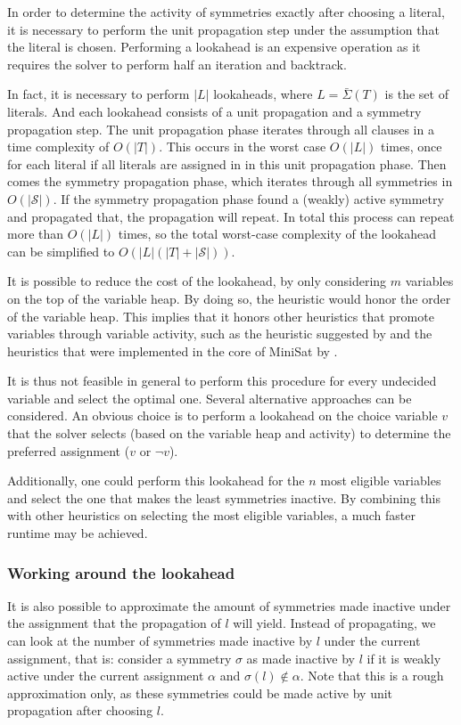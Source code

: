 	In order to determine the activity of symmetries exactly after choosing a literal,
	it is necessary to perform the unit propagation step under the assumption that the literal is chosen.
	Performing a lookahead is an expensive operation as it requires the solver to perform half an
	iteration and backtrack.

	In fact, it is necessary to perform $|L|$ lookaheads, where $L = \bar{\Sigma}(T)$ is the set of literals.
	And each lookahead consists of a unit propagation and a symmetry propagation step.
	The unit propagation phase iterates through all clauses in a time complexity of $O(|T|)$.
	This occurs in the worst case $O(|L|)$ times,
	once for each literal if all literals are assigned in in this unit propagation phase.
	Then comes the symmetry propagation phase, which iterates through all symmetries in $O(|\mathcal{S}|)$.
	If the symmetry propagation phase found a (weakly) active symmetry and propagated that,
	the propagation will repeat.
	In total this process can repeat more than $O(|L|)$ times,
	so the total worst-case complexity of the lookahead can be simplified to $O(|L|(|T| + |\mathcal{S}|))$.

	It is possible to reduce the cost of the lookahead, by only considering $m$ variables on
	the top of the variable heap.
	By doing so, the heuristic would honor the order of the variable heap.
	This implies that it honors other heuristics that promote variables through variable activity,
	such as the heuristic suggested by \cite{devriendt2012symmetry} and the heuristics that were
	implemented in the core of MiniSat by \cite{een2004extensible}.

	It is thus not feasible in general to perform this procedure for every undecided variable and
	select the optimal one.
	Several alternative approaches can be considered.
	An obvious choice is to perform a lookahead on the choice variable $v$ that the solver
	selects (based on the variable heap and activity) to determine the
	preferred assignment ($v$ or $\neg v$).

	Additionally, one could perform this lookahead for the $n$ most eligible variables
	and select the one that makes the least symmetries inactive.
	By combining this with other heuristics on selecting the most eligible variables,
	a much faster runtime may be achieved.

	\subsubsection{Working around the lookahead}
		It is also possible to approximate the amount of symmetries made inactive under the
		assignment that the propagation of $l$ will yield.
		Instead of propagating, we can look at the number of symmetries made inactive by $l$
		under the current assignment, that is: consider a symmetry $\sigma$ as
		made inactive by $l$ if it is weakly active under the current assignment $\alpha$ and
		$\sigma(l) \notin \alpha$.
		Note that this is a rough approximation only, as these symmetries could be made active by
		unit propagation after choosing $l$.

